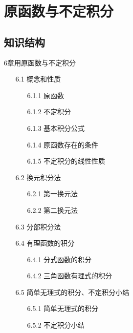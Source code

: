 \documentclass[12pt,UTF8]{ctexart}
\begin{document}
\setcounter{section}{8}
\section{原函数与不定积分}
\noindent
\subsection{知识结构}
6章用原函数与不定积分
	\begin{enumerate}
		\item[6.1] 概念和性质
			\begin{enumerate}
				\item[6.1.1] 原函数
				\item[6.1.2] 不定积分
				\item[6.1.3] 基本积分公式
				\item[6.1.4] 原函数存在的条件
				\item[6.1.5] 不定积分的线性性质
			\end{enumerate}
		\item[6.2] 换元积分法
			\begin{enumerate}
				\item[6.2.1] 第一换元法
				\item[6.2.2] 第二换元法
			\end{enumerate}
		\item[6.3] 分部积分法
		\item[6.4] 有理函数的积分
			\begin{enumerate}
				\item[6.4.1] 分式函数的积分
				\item[6.4.2] 三角函数有理式的积分
			\end{enumerate}
		\item[6.5] 简单无理式的积分、不定积分小结
			\begin{enumerate}
				\item[6.5.1] 简单无理式的积分
				\item[6.5.2] 不定积分小结
			\end{enumerate}
	\end{enumerate}
\end{document}
